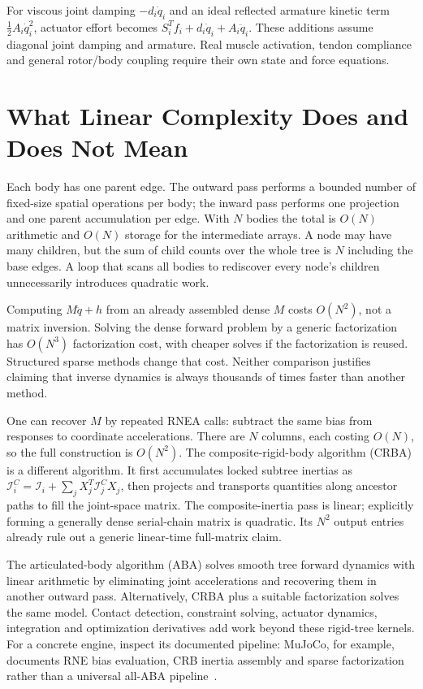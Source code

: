 For viscous joint damping $-d_i\dot q_i$ and an ideal reflected armature kinetic term $\tfrac12 A_i\dot q_i^2$, actuator effort becomes $S_i^Tf_i+d_i\dot q_i+A_i\ddot q_i$. These additions assume diagonal joint damping and armature. Real muscle activation, tendon compliance and general rotor/body coupling require their own state and force equations.

\section{What Linear Complexity Does and Does Not Mean}
\label{sec:complexity}
\label{laymans:why_not_build_M}

Each body has one parent edge. The outward pass performs a bounded number of fixed-size spatial operations per body; the inward pass performs one projection and one parent accumulation per edge. With $N$ bodies the total is $O(N)$ arithmetic and $O(N)$ storage for the intermediate arrays. A node may have many children, but the sum of child counts over the whole tree is $N$ including the base edges. A loop that scans all bodies to rediscover every node's children unnecessarily introduces quadratic work.

Computing $M\ddot q+h$ from an already assembled dense $M$ costs $O(N^2)$, not a matrix inversion. Solving the dense forward problem by a generic factorization has $O(N^3)$ factorization cost, with cheaper solves if the factorization is reused. Structured sparse methods change that cost. Neither comparison justifies claiming that inverse dynamics is always thousands of times faster than another method.

One can recover $M$ by repeated RNEA calls: subtract the same bias from responses to coordinate accelerations. There are $N$ columns, each costing $O(N)$, so the full construction is $O(N^2)$. The composite-rigid-body algorithm (CRBA) is a different algorithm. It first accumulates locked subtree inertias as $\mathcal I_i^C=\mathcal I_i+\sum_jX_j^T\mathcal I_j^CX_j$, then projects and transports quantities along ancestor paths to fill the joint-space matrix. The composite-inertia pass is linear; explicitly forming a generally dense serial-chain matrix is quadratic. Its $N^2$ output entries already rule out a generic linear-time full-matrix claim.

The articulated-body algorithm (ABA) solves smooth tree forward dynamics with linear arithmetic by eliminating joint accelerations and recovering them in another outward pass. Alternatively, CRBA plus a suitable factorization solves the same model. Contact detection, constraint solving, actuator dynamics, integration and optimization derivatives add work beyond these rigid-tree kernels. For a concrete engine, inspect its documented pipeline: MuJoCo, for example, documents RNE bias evaluation, CRB inertia assembly and sparse factorization rather than a universal all-ABA pipeline~\cite{MuJoCoComputationReview}.

